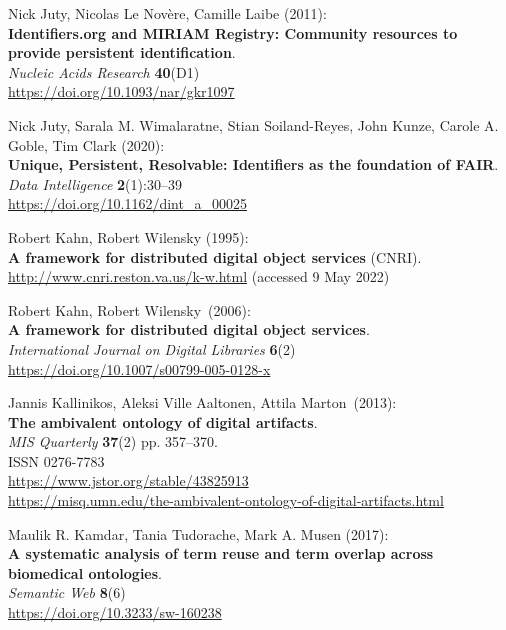 \begin{thebibliography}{9}
Nick Juty, Nicolas Le Novère, Camille Laibe (2011): \\
\textbf{Identifiers.org and {MIRIAM Registry}: Community resources to provide persistent identification}.\\
\emph{Nucleic Acids Research} \textbf{40}(D1) \\
\url{https://doi.org/10.1093/nar/gkr1097}

Nick Juty, Sarala M. Wimalaratne, Stian Soiland-Reyes, John Kunze, Carole A. Goble, Tim Clark (2020):\\
\textbf{Unique, Persistent, Resolvable: Identifiers as the foundation of FAIR}.
\emph{Data Intelligence} \textbf{2}(1):30–39\\
\url{https://doi.org/10.1162/dint_a_00025}

Robert Kahn, Robert Wilensky (1995): \\
\textbf{A framework for distributed digital object services} (CNRI).\\
\url{http://www.cnri.reston.va.us/k-w.html} (accessed 9 May 2022)


Robert Kahn, Robert Wilensky~(2006):\\
\textbf{A framework for distributed digital object services}.\\
\emph{International Journal on Digital Libraries} \textbf{6}(2)\\
\url{https://doi.org/10.1007/s00799-005-0128-x}

Jannis Kallinikos, Aleksi Ville Aaltonen, Attila Marton~(2013):\\
\textbf{The ambivalent ontology of digital artifacts}.\\ 
\emph{MIS Quarterly} \textbf{37}(2) pp. 357--370.\\
ISSN 0276-7783\\
\url{https://www.jstor.org/stable/43825913}\\
\url{https://misq.umn.edu/the-ambivalent-ontology-of-digital-artifacts.html}

Maulik R. Kamdar, Tania Tudorache, Mark A. Musen (2017): \\
\textbf{A systematic analysis of term reuse and term overlap across biomedical ontologies}. \\
\emph{Semantic Web} \textbf{8}(6) \\
\url{https://doi.org/10.3233/sw-160238}


\end{thebibliography}
